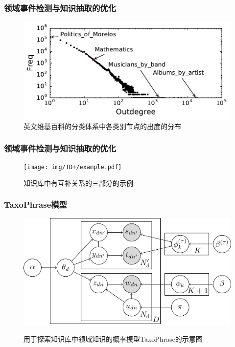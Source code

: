 \begin{frame}
\frametitle{领域事件检测与知识抽取的优化}	
\begin{figure}
	\caption{英文维基百科的分类体系中各类别节点的出度的分布}
    \includegraphics[width=1.0\textwidth]{img/TD+/outdegree_distribution.pdf}
\end{figure}
\end{frame}

\begin{frame}
\frametitle{领域事件检测与知识抽取的优化}	
\vspace{-5mm}
\begin{figure}
	\setlength{\abovecaptionskip}{0.cm}
	\setlength{\belowcaptionskip}{0.cm}
	\caption{知识库中有互补关系的三部分的示例}
    \texttt{[image: img/TD+/example.pdf]}
\end{figure}
\end{frame}

\begin{frame}
\frametitle{TaxoPhrase模型}
\begin{figure}
	\centering
	\caption{用于探索知识库中领域知识的概率模型TaxoPhrase的示意图}
    \includegraphics[width=0.8\columnwidth]{img/TD+/TaxoPhrase_inpaper.pdf}
	\label{fig:IllustrationTaxoPhrase}
\end{figure}
\end{frame}


